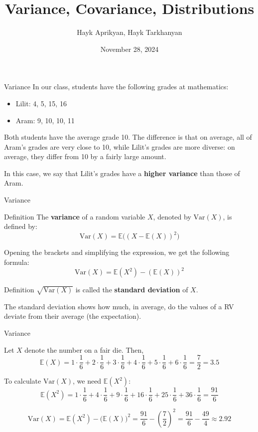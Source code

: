\documentclass{beamer}
\title[Lecture 10]{Variance, Covariance, Distributions}
\author[Aprikyan, Tarkhanyan]{Hayk Aprikyan, Hayk Tarkhanyan}
\institute[ACA]{Armenian Code Academy}
\date{November 28, 2024}
\newcommand{\E}{\mathbb{E}}
\newcommand{\Var}{\text{Var}}
\begin{document}
	
	\begin{frame}
		\titlepage
	\end{frame}
	
	
	\begin{frame}{Variance}
		In our class, students have the following grades at mathematics:
		\begin{itemize}
			\item Lilit: 4, 5, 15, 16
			\item Aram: 9, 10, 10, 11
		\end{itemize}
		
		\pause Both students have the average grade 10. \pause The difference is that on average, all of Aram's grades are very close to 10, while Lilit's grades are more diverse: on average, they differ from 10 by a fairly large amount.\pause

\medskip

		In this case, we say that Lilit's grades have a \textbf{higher variance} than those of Aram.
	\end{frame}
	
	\begin{frame}{Variance}
	\begin{block}{Definition}
		The \textbf{variance} of a random variable $X$, denoted by $\Var(X)$, is defined by:
		\[\Var(X) = \E\big((X-\E(X))^2\big)\]
	\end{block}
	\pause
	Opening the brackets and simplifying the expression, we get the following formula:
	\[
	\Var(X) = \E(X^2) - (\E(X))^2
	\]
	\pause
	\begin{block}{Definition}
		$\sqrt{\Var(X)}$ is called the \textbf{standard deviation} of $X$.
	\end{block}
	\pause
	The standard deviation shows how much, in average, do the values of a RV deviate from their average (the expectation).
	
	\end{frame}
	
	
	\begin{frame}{Variance}
		\begin{example}
			Let $X$ denote the number on a fair die. Then,
			\[
			\E(X) = 1 \cdot \frac{1}{6}+ 2 \cdot \frac{1}{6}+ 3 \cdot \frac{1}{6}+ 4 \cdot \frac{1}{6}+ 5 \cdot \frac{1}{6}+ 6 \cdot \frac{1}{6}=\frac{7}{2} =3.5
			\]
			
			To calculate $\Var(X)$, we need $\E(X^2)$:
			\[
			\E(X^2) =1 \cdot \frac{1}{6}+ 4\cdot \frac{1}{6}+ 9\cdot \frac{1}{6}+ 16 \cdot \frac{1}{6}+ 25\cdot \frac{1}{6}+ 36 \cdot \frac{1}{6}=\frac{91}{6}
			\]
			
			\[
			\Var(X)=\E(X^2)-\big(\E(X)\big)^2=\frac{91}{6}-\left(\frac{7}{2}\right)^2=\frac{91}{6}-\frac{49}{4}\approx 2.92
			\]
		\end{example}
		
	\end{frame}
	
\end{document}
